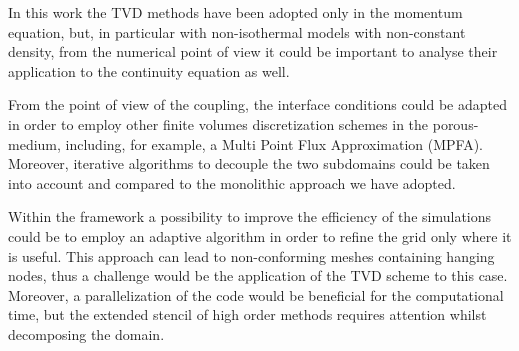 In this work the TVD methods have been adopted only in the momentum equation, 
but, in particular with non-isothermal models with non-constant density, from 
the numerical point of view it could be important to analyse their 
application to the continuity equation as well.

From the point of view of the coupling, the interface conditions could be adapted in order to employ other finite volumes discretization schemes in the porous-medium, including, for example, a Multi Point Flux Approximation (MPFA).
Moreover, iterative algorithms to decouple the two subdomains could be taken 
into account and compared to the monolithic approach we have adopted.

Within the \DUMUX framework a possibility to improve the efficiency of the 
simulations could be to employ an adaptive algorithm in order to refine the grid 
only where it is useful. This approach can lead to non-conforming meshes 
containing hanging nodes, thus a challenge would be the application of the TVD 
scheme to this case. Moreover, a parallelization of the code would be 
beneficial for the computational time, but the extended stencil of high order methods 
requires attention whilst decomposing the domain.